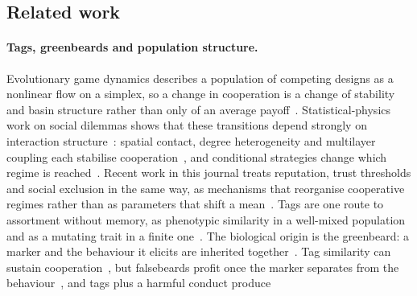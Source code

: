 
\subsection{Related work}
\label{sec:related}

\paragraph{Tags, greenbeards and population structure.}
Evolutionary game dynamics describes a population of competing designs as a
nonlinear flow on a simplex, so a change in cooperation is a change of
stability and basin structure rather than only of an average
payoff~\citep{taylor1978ess,hofbauer1998evolutionary,hofbauer2003evolutionary,sandholm2010population}.
Statistical-physics work on social dilemmas shows that these transitions depend
strongly on interaction structure~\citep{perc2017statphys}: spatial contact,
degree heterogeneity and multilayer coupling each stabilise
cooperation~\citep{nowak1992spatial,santos2005scale,wang2015multilayer}, and
conditional strategies change which regime is reached~\citep{szolnoki2012conditional}.
Recent work in this journal treats reputation, trust thresholds and social
exclusion in the same way, as mechanisms that reorganise cooperative regimes
rather than as parameters that shift a
mean~\citep{quan2019exclusion,zhu2025adaptive,zhang2026trust}. Tags are one
route to assortment without memory, as phenotypic similarity in a well-mixed
population~\citep{antal2009phenotypic} and as a mutating trait in a finite
one~\citep{traulsen2007chromodynamics,traulsen2003minimal}. The biological
origin is the greenbeard: a marker and the behaviour it elicits are inherited
together~\citep{hamilton1964genetical1,dawkins1976selfish}. Tag similarity can
sustain cooperation~\citep{riolo2001evolution}, but falsebeards profit once the
marker separates from the behaviour~\citep{roberts2002does,jansen2006altruism,gardner2010greenbeards},
and tags plus a harmful conduct produce
